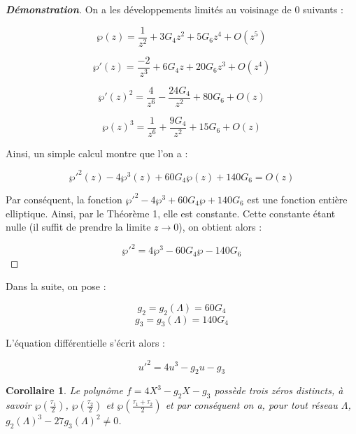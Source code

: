 \documentclass[12pt]{article}
\newtheorem{corollary}{Corollaire}
\begin{document}
                \begin{proof}[\textbf{Démonstration}] 
                On a les développements limités au voisinage de 0 suivants :
                
                \[
                \wp(z) = \frac{1}{z^2} + 3G_4z^2 + 5G_6z^4 + O(z^5)
                \]
                
                \[
                \wp'(z) = \frac{-2}{z^3} + 6G_4z + 20G_6z^3 + O(z^4)
                \]
                
                \[
                \wp'(z)^2 = \frac{4}{z^6} -  \frac{24G_4}{z^2} + 80G_6 + O(z)
                \]
                
                \[
                \wp(z)^3 = \frac{1}{z^6} + \frac{9G_4}{z^2}+ 15G_6 + O(z)
                \]
                
                Ainsi, un simple calcul montre que l'on a :
                
                \[
                \wp'^2(z) - 4\wp^3(z) + 60G_4\wp(z) + 140G_6 = O(z)
                \]
                
                Par conséquent, la fonction \(\wp'^2 - 4\wp^3 + 60G_4\wp + 140G_6\) est une fonction entière elliptique. Ainsi, par le Théorème 1, elle est constante. Cette constante étant nulle (il suffit de prendre la limite \(z \to 0\)), on obtient alors :
                
                \[
                \wp'^2 = 4\wp^3 - 60G_4\wp - 140G_6
                \]
                \end{proof}
                
                Dans la suite, on pose :
                
                \[
                g_2 = g_2(\Lambda) = 60G_4
                \]
                \[
                g_3 = g_3(\Lambda) = 140G_4
                \]
                
                L'équation différentielle s'écrit alors :
                
                \[
                u'^2 = 4u^3 - g_2u - g_3
                \]
                
                \begin{corollary}
                    Le polynôme \(f = 4X^3 - g_2X - g_3\) possède trois zéros distincts, à savoir \(\wp\left(\frac{\tau_1}{2}\right)\), \(\wp\left(\frac{\tau_2}{2}\right)\) et \(\wp\left(\frac{\tau_1 + \tau_2}{2}\right)\) et par conséquent on a, pour tout réseau \(\Lambda\), \(g_2(\Lambda)^3 - 27g_3(\Lambda)^2 \neq 0\).
                    \end{corollary}
                    
\end{document}
